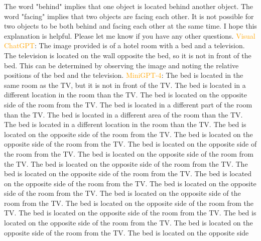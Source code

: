 \begin{enumerate}
    The word "behind" implies that one object is located behind another object.
    The word "facing" implies that two objects are facing each other.
    It is not possible for two objects to be both behind and facing each other at the same time.
    I hope this explanation is helpful. Please let me know if you have any other questions.
    \subitem \textcolor{orange}{Visual ChatGPT}: The image provided is of a hotel room with a bed and a television. The television is located on the wall opposite the bed, so it is not in front of the bed. This can be determined by observing the image and noting the relative positions of the bed and the television.
    \subitem \textcolor{orange}{MiniGPT-4}: The bed is located in the same room as the TV, but it is not in front of the TV. The bed is located in a different location in the room than the TV. The bed is located on the opposite side of the room from the TV. The bed is located in a different part of the room than the TV. The bed is located in a different area of the room than the TV. The bed is located in a different location in the room than the TV. The bed is located on the opposite side of the room from the TV. The bed is located on the opposite side of the room from the TV. The bed is located on the opposite side of the room from the TV. The bed is located on the opposite side of the room from the TV. The bed is located on the opposite side of the room from the TV. The bed is located on the opposite side of the room from the TV. The bed is located on the opposite side of the room from the TV. The bed is located on the opposite side of the room from the TV. The bed is located on the opposite side of the room from the TV. The bed is located on the opposite side of the room from the TV. The bed is located on the opposite side of the room from the TV. The bed is located on the opposite side of the room from the TV. The bed is located on the opposite side of the room from the TV. The bed is located on the opposite side
\end{enumerate}
